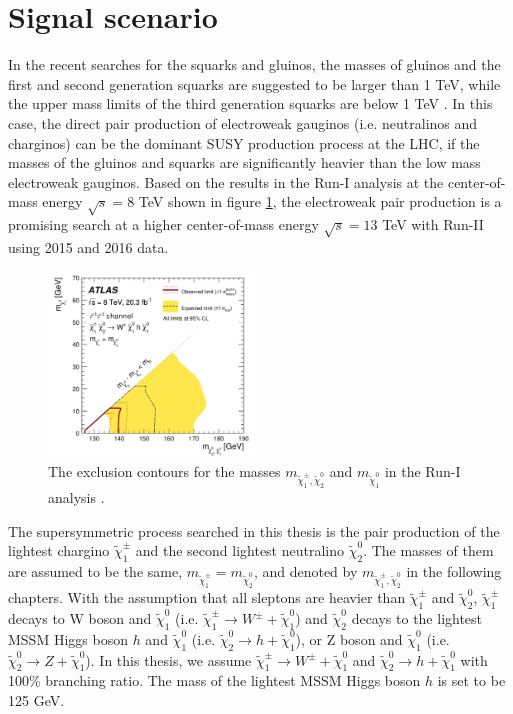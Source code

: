 \section{Signal scenario}
\label{sec:Wh_signal}
In the recent searches for the squarks and gluinos, the masses of gluinos and the first and second generation squarks are suggested to be larger than 1 TeV, while the upper mass limits of the third generation squarks are below 1 TeV \cite{gluinos}.
In this case, the direct pair production of electroweak gauginos (i.e. neutralinos and charginos) can be the dominant SUSY production process at the LHC, if the masses of the gluinos and squarks are significantly heavier than the low mass electroweak gauginos.
Based on the results in the Run-I analysis \cite{run1} at the center-of-mass energy $\sqrt{s} = 8$ TeV shown in figure \ref{fig:result_run1}, the electroweak pair production is a promising search at a higher center-of-mass energy $\sqrt{s} = 13$ TeV with Run-II using 2015 and 2016 data.

\begin{figure}
\centering
\includegraphics[width=0.5\textwidth]{data/photo/theory/run1.png}
\caption{The exclusion contours for the masses $m_{\tilde{\chi}_1^\pm , \tilde{\chi}_2^0}$ and $m_{\tilde{\chi}_1^0}$ in the Run-I analysis \cite{run1}.}
\label{fig:result_run1}
\end{figure}

The supersymmetric process searched in this thesis is the pair production of the lightest chargino $\tilde{\chi}_1^\pm$ and the second lightest neutralino $\tilde{\chi}_2^0$.
The masses of them are assumed to be the same, $m_{\tilde{\chi}_1^\pm} = m_{\tilde{\chi}_2^0}$, and denoted by $m_{\tilde{\chi}_1^\pm , \tilde{\chi}_2^0}$ in the following chapters.
With the assumption that all sleptons are heavier than $\tilde{\chi}_1^\pm$ and $\tilde{\chi}_2^0$,
$\tilde{\chi}_1^\pm$ decays to W boson and $\tilde{\chi}_1^0$ (i.e. $\tilde{\chi}_1^\pm \rightarrow W^{\pm} + \tilde{\chi}_1^0$)
and $\tilde{\chi}_2^0$ decays to the lightest MSSM Higgs boson $h$ and $\tilde{\chi}_1^0$ (i.e. $\tilde{\chi}_2^0 \rightarrow h + \tilde{\chi}_1^0$),
or Z boson and $\tilde{\chi}_1^0$ (i.e. $\tilde{\chi}_2^0 \rightarrow Z + \tilde{\chi}_1^0$).
In this thesis, we assume $\tilde{\chi}_1^\pm \rightarrow W^{\pm} + \tilde{\chi}_1^0$ and $\tilde{\chi}_2^0 \rightarrow h + \tilde{\chi}_1^0$ with 100\% branching ratio.
The mass of the lightest MSSM Higgs boson $h$ is set to be 125 GeV.

